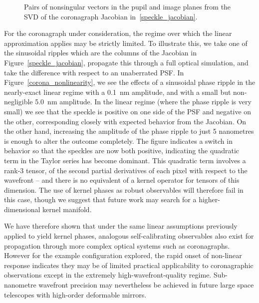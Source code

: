 \documentclass[modern]{aastex63}
\begin{document}
\begin{figure}
\caption{Pairs of nonsingular vectors in the pupil and image planes from the SVD of the coronagraph Jacobian in~\ref{speckle_jacobian}. \href{https://github.com/benjaminpope/morphine/blob/stable/notebooks/morphine_coronagraph.ipynb}{\color{linkcolor}\faGithub}
\label{nonsingular_corona}} 
\end{figure}

For the coronagraph under consideration, the regime over which the linear approximation applies may be strictly limited. To illustrate this, we take one of the sinusoidal ripples which are the columns of the Jacobian in Figure~\ref{speckle_jacobian}, propagate this through a full optical simulation, and take the difference with respect to an unaberrated PSF. In Figure~\ref{corona_nonlinearity}, we see the effects of a sinusoidal phase ripple in the nearly-exact linear regime with a 0.1~nm amplitude, and with a small but non-negligible 5.0~nm amplitude. In the linear regime (where the phase ripple is very small) we see that the speckle is positive on one side of the PSF and negative on the other, corresponding closely with expected behavior from the Jacobian. On the other hand, increasing the amplitude of the phase ripple to just 5 nanometres is enough to alter the outcome completely. The figure indicates a switch in behavior so that the speckles are now both positive, indicating the quadratic term in the Taylor series has become dominant. This quadratic term involves a rank-3 tensor, of the second partial derivatives of each pixel with respect to the wavefront -- and there is no equivalent of a kernel operator for tensors of this dimension. The use of kernel phases as robust observables will therefore fail in this case, though we suggest that future work may search for a higher-dimensional kernel manifold. 

We have therefore shown that under the same linear assumptions previously applied to yield kernel phases, analogous self-calibrating observables also exist for propagation through more complex optical systems such as coronagraphs. However for the example configuration explored, the rapid onset of non-linear response indicates they may be of limited practical applicability to coronagraphic observations except in the extremely high-wavefront-quality regime. Sub-nanometre wavefront precision may nevertheless be achieved in future large space telescopes with high-order deformable mirrors.
\end{document}
